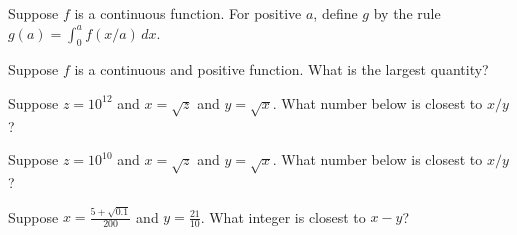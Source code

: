 \documentclass{ximera}
\begin{document}


\begin{problem}
  Suppose $f$ is a continuous function.  For positive $a$, define $g$ by the rule $g(a) = \int_0^a f(x/a) \, dx$.
  \begin{multipleChoice}
  \end{multipleChoice}
\end{problem}

\begin{problem}
  Suppose $f$ is a continuous and positive function.  What is the largest quantity?
  \begin{multipleChoice}
  \end{multipleChoice}
\end{problem}



\begin{problem}
  Suppose $z = 10^{12}$ and $x = \sqrt{z}$ and $y = \sqrt{x}$.  What number below is closest to $x/y$?
  \begin{multipleChoice}
  \end{multipleChoice}
\end{problem}

\begin{problem}
  Suppose $z = 10^{10}$ and $x = \sqrt{z}$ and $y = \sqrt{x}$.  What number below is closest to $x/y$?
  \begin{multipleChoice}
  \end{multipleChoice}
\end{problem}

\begin{problem}
  Suppose $x = \frac{5 + \sqrt{0.1}}{200}$ and $y = \frac{21}{10}$.  What integer is closest to $x - y$?
  \begin{multipleChoice}
  \end{multipleChoice}
\end{problem}
\end{document}
